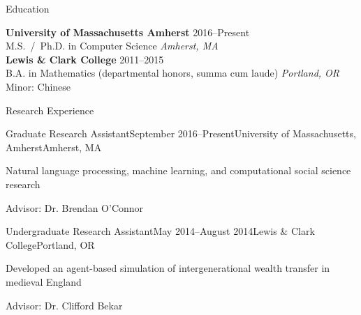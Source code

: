 \documentclass{resume} %
\begin{document}
%


\begin{rSection}{Education}

{\bf University of Massachusetts Amherst} \hfill {2016--Present} \\ 
M.S.~/~Ph.D. in Computer Science \hfill {\em Amherst, MA} \\

{\bf Lewis \& Clark College} \hfill {2011--2015} \\ 
B.A. in Mathematics (departmental honors, summa cum laude) \hfill {\em Portland, OR} \\
Minor: Chinese \\

\end{rSection}


\begin{rSection}{Research Experience}

\begin{rSubsection}{Graduate Research Assistant}{September 2016--Present}{University of Massachusetts, Amherst}{Amherst, MA}
\item Natural language processing, machine learning, and computational social science research
\item Advisor: Dr. Brendan O'Connor 
\end{rSubsection}


\begin{rSubsection}{Undergraduate Research Assistant}{May 2014--August 2014}{Lewis \& Clark College}{Portland, OR}
\item Developed an agent-based simulation of intergenerational wealth transfer in medieval England
\item Advisor: Dr. Clifford Bekar
\end{rSubsection}

\end{rSection}
\end{document}
